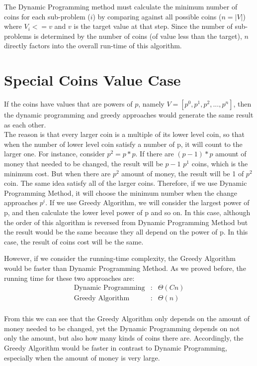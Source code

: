 \documentclass[11pt]{scrreprt}
\begin{document}
The Dynamic Programming method must calculate the minimum number of coins for each sub-problem ($i$) by comparing against all possible coins ($n = |V|$) where $V_i <= v$ and $v$ is the target value at that step. Since the number of sub-problems is determined by the number of coins (of value less than the target), $n$ directly factors into the overall run-time of this algorithm.

\section{Special Coins Value Case}

If the coins have values that are powers of $p$, namely $V = [p^0 , p^1 , p^2 , ... , p^n]$, then the dynamic programming and greedy approaches would generate the same result as each other.\\

The reason is that every larger coin is a multiple of its lower level coin, so that when the number of lower level coin satisfy a number of p, it will count to the larger one. For instance, consider $p^2 = p*p$. If there are $(p-1)*p$ amount of money that needed to be changed, the result will be $p-1$ $p^1$ coins, which is the minimum cost. But when there are $p^2$ amount of money, the result will be 1 of $p^2$ coin. The same idea satisfy all of the larger coins. Therefore, if we use Dynamic Programming Method, it will choose the minimum number when the change approaches $p^i$. If we use Greedy Algorithm, we will consider the largest power of p, and then calculate the lower level power of p and so on. In this case, although the order of this algorithm is reversed from Dynamic Programming Method but the result would be the same because they all depend on the power of p. In this case, the result of coins cost will be the same.

However, if we consider the running-time complexity, the Greedy Algorithm would be faster than Dynamic Programming Method. As we proved before, the running time for these two approaches are:
\begin{eqnarray*}
\mbox{Dynamic Programming}&:& \Theta(Cn)\\
\mbox{Greedy Algorithm}&:& \Theta(n)\\
\end{eqnarray*}

From this we can see that the Greedy Algorithm only depends on the amount of money needed to be changed, yet the Dynamic Programming depends on not only the amount, but also how many kinds of coins there are. Accordingly, the Greedy Algorithm would be faster in contrast to Dynamic Programming, especially when the amount of money is very large.
\end{document}
